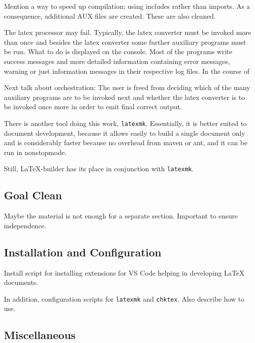 Mention a way to speed up compilation: using includes rather than imports. 
As a consequence, additional AUX files are created. 
These are also cleaned. 

The latex processor may fail. 
Typically, the latex converter must be invoked more than once 
and besides the latex converter some further auxiliary programs must be run. 
What to do is displayed on the console. 
Most of the programs write success messages and more detailed information 
containing error messages, warning or just information messages in their respective log files. 
In the course of 


Next talk about orchestration: 
The user is freed from deciding which of the many auxiliary programs are to be invoked next 
and whether the latex converter is to be invoked once more 
in order to emit final correct output. 

There is another tool doing this work, \texttt{latexmk}. 
Essentially, it is better suited to document development, 
because it allows easily to build a single document only and is considerably faster 
because no overhead from maven or ant, 
and it can be run in nonstopmode. 

Still, \LaTeX-builder has its place in conjunction with \texttt{latexmk}. 


\subsection{Goal Clean}\label{subsec:develClean}

Maybe the material is not enough for a separate section. 
Important to ensure independence. 


\subsection{Installation and Configuration}\label{subsec:develConfig}

Install script for installing extensions for VS Code 
helping in developing \LaTeX{} documents. 

In addition, configuration scripts for \texttt{latexmk} and \texttt{chktex}. 
Also describe how to use. 



\subsection{Miscellaneous}%




